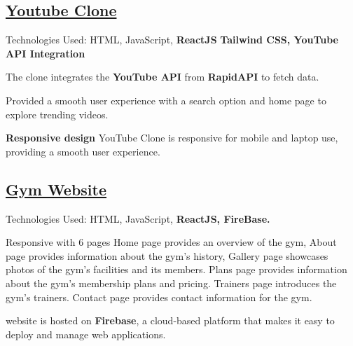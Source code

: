 \subsection{{\href{https://clone-c42e9.web.app/}{Youtube Clone} \hfill }}
\begin{zitemize}
\item Technologies Used: HTML, JavaScript,  
{\textbf{ReactJS}}
\textbf{Tailwind CSS, YouTube API Integration} 
  
\item  The clone integrates the \textbf{YouTube API} from \textbf{RapidAPI} to fetch data.
\item Provided a smooth user experience with a search option and home page to explore trending videos.
\item \textbf{Responsive design} YouTube Clone is responsive for mobile and laptop use, providing a smooth user experience.
\end{zitemize}



\subsection{{\href{https://react-modern-website.web.app/}{ Gym Website} \hfill }}
\begin{zitemize}
\item Technologies Used: HTML, JavaScript,  
{\textbf{ReactJS, FireBase.}}
\item Responsive with 6 pages Home page provides an overview of the gym,
About page provides information about the gym's history,
Gallery page  showcases photos of the gym's facilities and its members.
Plans page provides information about the gym's membership plans and pricing.
Trainers page introduces the gym's trainers.
Contact page  provides contact information for the gym.

\item website is hosted on \textbf{Firebase}, a cloud-based platform that makes it easy to deploy and manage web applications.
\end{zitemize}

